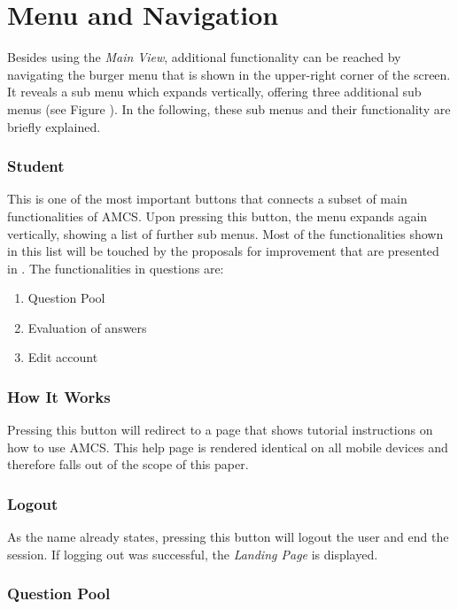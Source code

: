\section{Menu and Navigation}
Besides using the \emph{Main View}, additional functionality can be reached by navigating the burger menu that is shown in the upper-right corner of the screen. It reveals a sub menu which expands vertically, offering three additional sub menus (see Figure \todosct). In the following, these sub menus and their functionality are briefly explained.

\subsubsection{Student}

This is one of the most important buttons that connects a subset of main functionalities of AMCS. Upon pressing this button, the menu expands again vertically, showing a list of further sub menus. Most of the functionalities shown in this list will be touched by the proposals for improvement that are presented in . The functionalities in questions are:

\begin{enumerate}
	\item Question Pool
	\item Evaluation of answers
	\item Edit account
\end{enumerate}


\subsubsection{How It Works}

Pressing this button will redirect to a page that shows tutorial instructions on how to use AMCS.
This help page is rendered identical on all mobile devices and therefore falls out of the scope of this paper.

\subsubsection{Logout}

As the name already states, pressing this button will logout the user and end the session. 
If logging out was successful, the \emph{Landing Page} is displayed.

\subsubsection{Question Pool}

